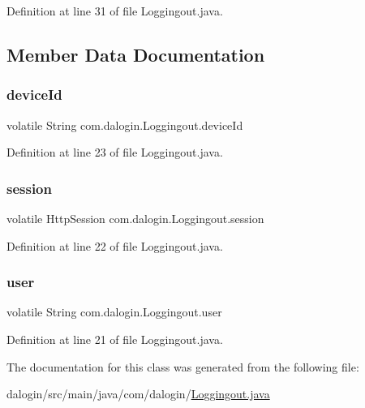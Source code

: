 Definition at line 31 of file Loggingout.\+java.



\subsection{Member Data Documentation}
\mbox{\label{classcom_1_1dalogin_1_1_loggingout_a976c5dd63eeb11a8614887dccb1ca982}} 
\subsubsection{\texorpdfstring{device\+Id}{deviceId}}
{\footnotesize\ttfamily volatile String com.\+dalogin.\+Loggingout.\+device\+Id\hspace{0.3cm}{\ttfamily [static]}}



Definition at line 23 of file Loggingout.\+java.

\mbox{\label{classcom_1_1dalogin_1_1_loggingout_a819b6765610e89eddfc440731da97c5b}} 
\subsubsection{\texorpdfstring{session}{session}}
{\footnotesize\ttfamily volatile Http\+Session com.\+dalogin.\+Loggingout.\+session\hspace{0.3cm}{\ttfamily [static]}}



Definition at line 22 of file Loggingout.\+java.

\mbox{\label{classcom_1_1dalogin_1_1_loggingout_abf244ba3efc4816ad0427112009b631a}} 
\subsubsection{\texorpdfstring{user}{user}}
{\footnotesize\ttfamily volatile String com.\+dalogin.\+Loggingout.\+user\hspace{0.3cm}{\ttfamily [static]}}



Definition at line 21 of file Loggingout.\+java.



The documentation for this class was generated from the following file\+:\begin{DoxyCompactItemize}
\item 
dalogin/src/main/java/com/dalogin/\hyperlink{_loggingout_8java}{Loggingout.\+java}\end{DoxyCompactItemize}
